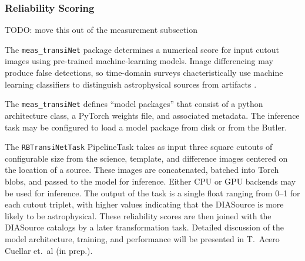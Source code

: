 \subsubsection{Reliability Scoring}
\label{sec:reliability}

TODO: move this out of the measurement subsection

The \texttt{meas\_transiNet} package determines a numerical score for input cutout images using pre-trained machine-learning models.
Image differencing may produce false detections, so time-domain surveys chacteristically use machine learning classifiers to distinguish astrophysical sources from artifacts \citep[``Real/Bogus;'' e.g.,][]{2012PASP..124.1175B, 2015AJ....150...82G, 2019MNRAS.489.3582D}.

The \texttt{meas\_transiNet} defines ``model packages'' that consist of a python architecture class, a PyTorch \citep{NEURIPS2019_bdbca288} weights file, and associated metadata.
The inference task may be configured to load a model package from disk or from the Butler.

The \texttt{RBTransiNetTask} PipelineTask takes as input three square cutouts of configurable size from the science, template, and difference images centered on the location of a source.
These images are concatenated, batched into Torch blobs, and passed to the model for inference.
Either CPU or GPU backends may be used for inference.
The output of the task is a single float ranging from 0--1 for each cutout triplet, with higher values indicating that the DIASource is more likely to be astrophysical.
These reliability scores are then joined with the DIASource catalogs by a later transformation task.
Detailed discussion of the model architecture, training, and performance will be presented in T.\ Acero Cuellar et.\ al (in prep.).
